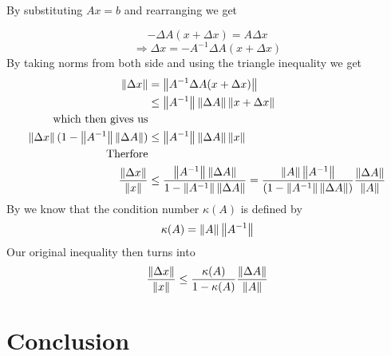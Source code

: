 \documentclass[12pt,reqno,twoside,titlepage]{article}
\theoremstyle{definition}
\begin{document}
By substituting $Ax=b$ and rearranging  we get

$$-\Delta A(x+\Delta x)=A\Delta x$$
$$\Rightarrow \Delta x=-A^{-1}\Delta A(x+\Delta x)$$
By taking norms from both side and using the triangle inequality we get
\begin{align*}
\left\lVert\Delta x\right\rVert&=\left\lVert A^{-1}\Delta A(x+\Delta x)\right\rVert
\\ &\leq \left\lVert A^{-1}\right\rVert\left\lVert\Delta A\right\rVert \left\lVert x+ \Delta x\right\rVert\\
\text{which then gives us}\\
\left\lVert\Delta x\right\rVert(1-\left\lVert A^{-1}\right\rVert\left\lVert\Delta A\right\rVert)&\leq\left\lVert A^{-1}\right\rVert\left\lVert\Delta A\right\rVert\left\lVert x\right\rVert
\\\text{Therfore}\\
\frac{\left\lVert\Delta x\right\rVert}{\left\lVert x\right\rVert} &\leq\frac{\left\lVert A^{-1}\right\rVert\left\lVert\Delta A\right\rVert}{1-\left\lVert A^{-1}\right\rVert\left\lVert\Delta A\right\rVert}
=\frac{\left\lVert A\right\rVert\left\lVert A^{-1}\right\rVert}{(1-\left\lVert A^{-1}\right\rVert\left\lVert\Delta A\right\rVert)}\frac{\left\lVert\Delta A\right\rVert}{\left\lVert A\right\rVert}
\end{align*}
By \cite{golub2012matrix} we know that the condition number $\kappa (A)$ is defined by
$$\kappa (A)=\left\lVert A\right\rVert\left\lVert A^{-1}\right\rVert$$
Our original inequality then turns into
$$\frac{\left\lVert\Delta x\right\rVert}{\left\lVert x\right\rVert}\leq\frac{\kappa (A)}{1-\kappa(A)}\frac{\left\lVert\Delta A\right\rVert}{\left\lVert A\right\rVert}$$

\section{Conclusion}


\end{document}
